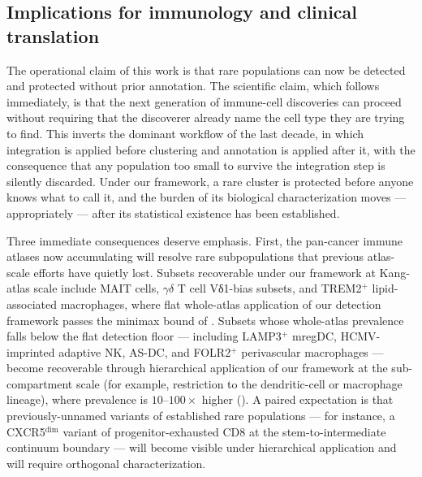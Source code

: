 
\subsection{Implications for immunology and clinical translation}
\label{sec:discussion-immunology}

The operational claim of this work is that rare populations can now be detected and protected without prior annotation. The scientific claim, which follows immediately, is that the next generation of immune-cell discoveries can proceed without requiring that the discoverer already name the cell type they are trying to find. This inverts the dominant workflow of the last decade, in which integration is applied before clustering and annotation is applied after it, with the consequence that any population too small to survive the integration step is silently discarded. Under our framework, a rare cluster is protected before anyone knows what to call it, and the burden of its biological characterization moves --- appropriately --- after its statistical existence has been established.

Three immediate consequences deserve emphasis. First, the pan-cancer immune atlases now accumulating \citep{kang2024integrated, cheng2021pancancer, zheng2021pancancer} will resolve rare subpopulations that previous atlas-scale efforts have quietly lost. Subsets recoverable under our framework at Kang-atlas scale include MAIT cells, $\gamma\delta$ T cell Vδ1-bias subsets, and TREM2$^+$ lipid-associated macrophages, where flat whole-atlas application of our detection framework passes the minimax bound of . Subsets whose whole-atlas prevalence falls below the flat detection floor --- including LAMP3$^+$ mregDC, HCMV-imprinted adaptive NK, AS-DC, and FOLR2$^+$ perivascular macrophages --- become recoverable through hierarchical application of our framework at the sub-compartment scale (for example, restriction to the dendritic-cell or macrophage lineage), where prevalence is $10$--$100\times$ higher (). A paired expectation is that previously-unnamed variants of established rare populations --- for instance, a CXCR5$^{\mathrm{dim}}$ variant of progenitor-exhausted CD8 at the stem-to-intermediate continuum boundary --- will become visible under hierarchical application and will require orthogonal characterization.

